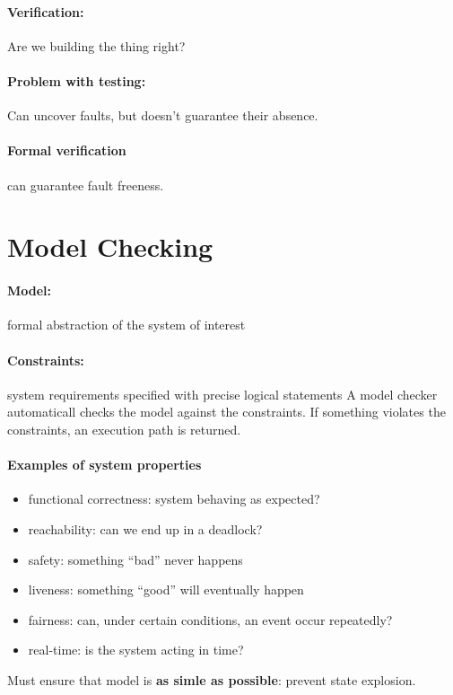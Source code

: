 \documentclass{article}
\begin{document}
\paragraph{Verification:} Are we building the thing right?

\paragraph{Problem with testing:} Can uncover faults, but doesn't guarantee
their absence.

\paragraph{Formal verification} can guarantee fault freeness.

\section{Model Checking}
\paragraph{Model:} formal abstraction of the system of interest
\paragraph{Constraints:} system requirements specified with precise logical statements 
A model checker automaticall checks the model against the constraints. If
something violates the constraints, an execution path is returned.

\paragraph{Examples of system properties}
\begin{itemize}
\item functional correctness: system behaving as expected?
\item reachability: can we end up in a deadlock?
\item safety: something ``bad'' never happens
\item liveness: something ``good'' will eventually happen
\item fairness: can, under certain conditions, an event occur repeatedly?
\item real-time: is the system acting in time?
\end{itemize}

Must ensure that model is \textbf{as simle as possible}: prevent state explosion.
\end{document}
